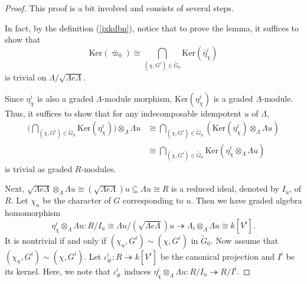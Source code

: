 \documentclass[11pt,reqno]{amsart}
\theoremstyle{definition}
\begin{document}
\begin{proof}
This proof is a bit involved and
consists of several steps.

\vspace{2mm}


In fact, by the definition 
(\ref{jxkdbn}), notice that to 
prove the lemma,
it suffices to show that 
$$
\mathrm{Ker}(\bar{\varpi}_0) \cong \bigcap\limits_{(\chi, G^i) \in \tilde{G}_0}
 \mathrm{Ker}(\bar{\eta}^{i}_{\chi})	
$$	
is trivial on $\Lambda / \sqrt{\Lambda e \Lambda}$. 


Since $\eta^{i}_{\chi}$ is also a graded $\Lambda$-module morphism,
$\mathrm{Ker}(\eta^{i}_{\chi})$ is a graded $\Lambda$-module. Thus, it suffices to show that for any 
indecomposable idempotent $u$ of $\Lambda$, 
\begin{align}\label{qsxbd83}	
\Big(\bigcap\limits_{(\chi, G^i) \in \tilde{G}_0} \mathrm{Ker}(\eta^{i}_{\chi}) \Big)\otimes_{\Lambda} \Lambda u 
& \cong  \bigcap\limits_{(\chi, G^i) \in \tilde{G}_0} ( \mathrm{Ker}(\eta^{i}_{\chi}) 
\otimes_{\Lambda} \Lambda u ) \nonumber \\
 & \cong \bigcap\limits_{(\chi, G^i) \in \tilde{G}_0} \mathrm{Ker} (\eta^{i}_{\chi} 
 \otimes_{\Lambda} \Lambda u ) 
\end{align}
is trivial as graded $R$-modules. 

Next, $\sqrt{\Lambda e \Lambda} \otimes_{\Lambda} \Lambda u \cong (\sqrt{\Lambda e \Lambda} )u
\subseteq \Lambda u \cong R$ is a reduced ideal, denoted by $I_u$, of $R$.  
%
Let $\chi_u$ be the character of $G$ corresponding to $u$. 
Then we have graded algebra homomorphism $$\eta^{i}_{\chi} \otimes_{\Lambda} \Lambda u : 
R/I_u \cong \Lambda u \big/ (\sqrt{\Lambda e \Lambda} )u \twoheadrightarrow  \Lambda_i \otimes_{\Lambda} \Lambda u \cong k[V^i].$$
It is nontrivial if and only 
if $(\chi_u, G^i) \sim (\chi, G^i)$ in $\tilde{G}_0$. 
Now assume
that $(\chi_u, G^i) \sim (\chi, G^i)$. 
Let $\iota_{\#}^i : R \twoheadrightarrow k[V^i]$ be the canonical projection and $I^i$ be its kernel. 
Here, we note that
$\iota_{\#}^i$ induces $\eta^{i}_{\chi} 
\otimes_{\Lambda} \Lambda u : R/ I_u \twoheadrightarrow R/I^i$. 


\end{proof}
\end{document}
